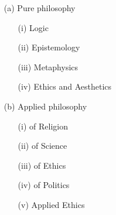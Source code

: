 \documentclass[10pt,titlepage]{article}
\begin{document}
\begin{itemize}
\item[(a)] Pure philosophy
\begin{itemize}

\item[(i)] Logic

\item[(ii)] Epistemology
  
\item[(iii)] Metaphysics
  
\item[(iv)] Ethics and Aesthetics

\end{itemize}

\item[(b)] Applied philosophy
\begin{itemize}

\item[(i)] of Religion
  
\item[(ii)] of Science
  
\item[(iii)] of Ethics
  
\item[(iv)] of Politics
  
\item[(v)] Applied Ethics

\end{itemize}

\end{itemize}





\appendix









\end{document}
